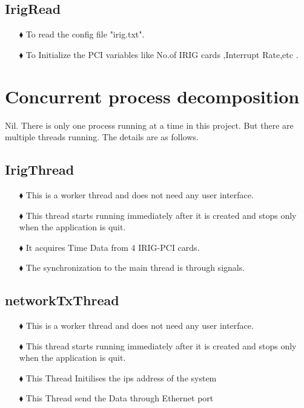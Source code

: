     \subsection{IrigRead}
    \begin{enumerate}
    	\item [$\blacklozenge$] To read the config file "irig.txt".
    	\item [$\blacklozenge$] To Initialize the PCI variables like No.of IRIG cards ,Interrupt Rate,etc .
    \end{enumerate}
    
\section{Concurrent process decomposition}

Nil. There is only one process running at a time in this project. But there are multiple threads running. The details are as follows.
       \subsection{IrigThread} 
       
        \begin{enumerate}
       	\item [$\blacklozenge$] This is a worker thread and does not need any user interface. 
       	\item [$\blacklozenge$] This thread starts running immediately after it is created and stops only when the application is quit.  
       	\item [$\blacklozenge$] It acquires Time Data from 4 IRIG-PCI cards.
       	\item [$\blacklozenge$] The synchronization to the main thread is through signals.
       	
       \end{enumerate}	
       
       \subsection{networkTxThread} 
   
       \begin{enumerate}
    \item [$\blacklozenge$] This is a worker thread and does not need any user interface.
    \item [$\blacklozenge$] This thread starts running immediately after it is created and stops only when the application is quit.
    \item [$\blacklozenge$] This Thread Initilises the ips address of the system
   	\item [$\blacklozenge$] This Thread send the Data through Ethernet port
   
   \end{enumerate}
	
